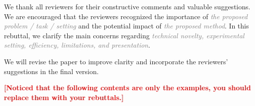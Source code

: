 \documentclass[sigconf,screen,review,anonymous]{acmart}
\title[\RebuttalShortTitle]{\RebuttalTitle}
\author{Anonymous Author(s)}
\affiliation{\institution{Anonymous Institution}\country{}}
\newcommand{\placeholder}[1]{\textcolor{gray}{\textit{#1}}}
\begin{document}
\maketitle

\noindent
We thank all reviewers for their constructive comments and valuable suggestions. We are encouraged that the reviewers recognized the importance of \placeholder{the proposed problem / task / setting} and the potential impact of \placeholder{the proposed method}. In this rebuttal, we clarify the main concerns regarding \placeholder{technical novelty, experimental setting, efficiency, limitations, and presentation}.

We will revise the paper to improve clarity and incorporate the reviewers' suggestions in the final version.

\noindent \textcolor{red}{\textbf{[Noticed that the following contents are only the examples, you should replace them with your rebuttals.]}}









\end{document}
